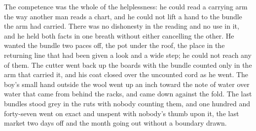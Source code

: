 The competence was the whole of the helplessness: he could read a carrying arm the way another man reads a chart, and he could not lift a hand to the bundle the arm had carried. There was no dishonesty in the reading and no use in it, and he held both facts in one breath without either cancelling the other. He wanted the bundle two paces off, the pot under the roof, the place in the returning line that had been given a look and a wide step; he could not reach any of them. The cutter went back up the boards with the bundle counted only in the arm that carried it, and his coat closed over the uncounted cord as he went. The boy's small hand outside the wool went up an inch toward the note of water over water that came from behind the racks, and came down against the fold. The last bundles stood grey in the ruts with nobody counting them, and one hundred and forty-seven went on exact and unspent with nobody's thumb upon it, the last market two days off and the month going out without a boundary drawn.
